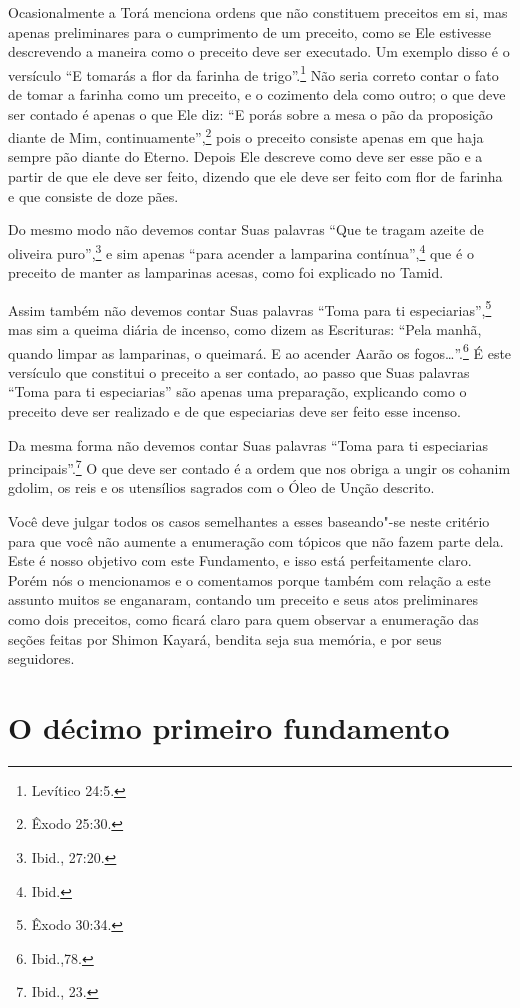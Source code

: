 Ocasionalmente a Torá\starr{} menciona ordens que não constituem preceitos em
si, mas apenas preliminares para o cumprimento de um preceito, como se
Ele estivesse descrevendo a maneira como o preceito deve ser executado.
Um exemplo disso é o versículo ``E tomarás a flor da farinha de trigo''.\footnote{Levítico 24:5.} Não seria correto contar o fato de tomar a farinha
como um preceito, e o cozimento dela como outro; o que deve ser contado
é apenas o que Ele diz: ``E porás sobre a mesa o pão da proposição
diante de Mim, continuamente'',\footnote{Êxodo 25:30.} pois o preceito consiste
apenas em que haja sempre pão diante do Eterno. Depois Ele descreve como
deve ser esse pão e a partir de que ele deve ser feito, dizendo que ele
deve ser feito com flor de farinha e que consiste de doze pães.

Do mesmo modo não devemos contar Suas palavras ``Que te tragam azeite de
oliveira puro'',\footnote{Ibid., 27:20.} e sim apenas ``para acender a lamparina
contínua'',\footnote{Ibid.} que é o preceito de manter as lamparinas acesas,
como foi explicado no Tamid\starr.

Assim também não devemos contar Suas palavras ``Toma para ti
especiarias'',\footnote{Êxodo 30:34.} mas sim a queima diária de incenso, como
dizem as Escrituras: ``Pela manhã, quando limpar as lamparinas, o
queimará. E ao acender Aarão os fogos\ldots{}''.\footnote{Ibid.,78.} É este versículo que constitui o
preceito a ser contado, ao passo que Suas palavras ``Toma para ti
especiarias'' são apenas uma preparação, explicando como o preceito deve
ser realizado e de que especiarias deve ser feito esse incenso.

Da mesma forma não devemos contar Suas palavras ``Toma para ti
especiarias principais''.\footnote{Ibid., 23.} O que deve ser contado é a ordem
que nos obriga a ungir os cohanim gdolim\starr, os reis e os utensílios
sagrados com o Óleo de Unção descrito.

Você deve julgar todos os casos semelhantes a esses baseando"-se neste
critério para que você não aumente a enumeração com tópicos que não
fazem parte dela. Este é nosso objetivo com este Fundamento, e isso está
perfeitamente claro. Porém nós o mencionamos e o comentamos porque
também com relação a este assunto muitos se enganaram, contando um
preceito e seus atos preliminares como dois preceitos, como ficará
claro para quem observar a enumeração das seções feitas por Shimon
Kayará, bendita seja sua memória, e por seus seguidores.

\chapter*{O décimo primeiro fundamento}

